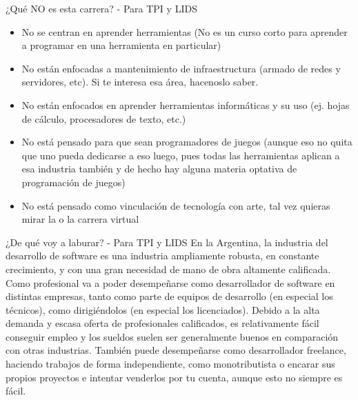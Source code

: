 
\begin{frame}{¿Qué NO es esta carrera? - Para TPI y LIDS}
  \small{\begin{itemize}
    \item No se centran en aprender herramientas (No es un curso corto para aprender a
      programar en una herramienta en particular)
    \item No están enfocadas a mantenimiento de infraestructura (armado de redes
      y servidores, etc). Si te interesa esa área, hacenoslo saber.
    \item No están enfocados en aprender herramientas informáticas y su uso
      (ej. hojas de cálculo, procesadores de texto, etc.)
    \item No está pensado para que sean programadores de juegos (aunque eso no
      quita que uno pueda dedicarse a eso luego, pues todas las herramientas
      aplican a esa industria también y de hecho hay alguna materia optativa de
      programación de juegos)
    \item No está pensado como vinculación de tecnología con arte, tal vez
      quieras mirar la  o la
      carrera virtual 
  \end{itemize}
  }
\end{frame}


\begin{frame}{¿De qué voy a laburar? - Para TPI y LIDS}
  \small{
    En la Argentina, la industria del desarrollo de software es una industria
    ampliamente robusta, en constante crecimiento, y con una gran necesidad de
    mano de obra altamente calificada.
    \jump
    Como profesional va a poder desempeñarse como desarrollador de software en
    distintas empresas, tanto como parte de equipos de desarrollo (en especial los
    técnicos), como dirigiéndolos (en especial los licenciados).
    \jump
    Debido a la alta demanda y escasa oferta de profesionales calificados, es
    relativamente fácil conseguir empleo y los sueldos suelen ser generalmente
    buenos en comparación con otras industrias.
    \jump
    También puede desempeñarse como desarrollador freelance, haciendo trabajos
    de forma independiente, como monotributista o encarar sus propios proyectos
    e intentar venderlos por tu cuenta, aunque esto no siempre es fácil.
  }
\end{frame}

